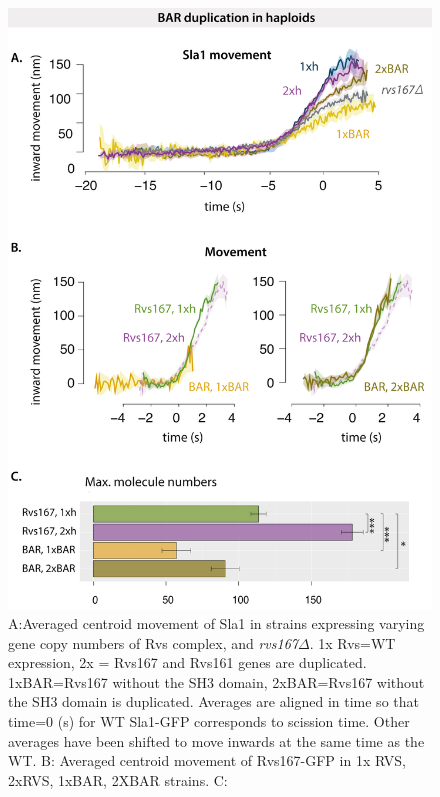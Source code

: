 		\begin{figure}[H]
		\centering
		\includegraphics[width=25cm,height=25 cm,keepaspectratio]{figures/results_final/scaffolding_overlaid3}
		\caption [Progression of invagination with increasing BAR recruitment]
		{A:Averaged centroid movement of Sla1 in strains expressing varying gene copy numbers of Rvs complex, and \textit{rvs167$\Delta$}. 1x Rvs=WT expression, 2x = Rvs167 and Rvs161 genes are duplicated. 1xBAR=Rvs167 without the SH3 domain, 2xBAR=Rvs167 without the SH3 domain is duplicated. Averages are aligned in time so that time=0 (s) for WT Sla1-GFP corresponds to scission time. Other averages have been shifted to move inwards at the same time as the WT.
		B: Averaged centroid movement of Rvs167-GFP in 1x RVS, 2xRVS, 1xBAR, 2XBAR strains.
		C:  }
		\label{fig_scaffold}
		\end{figure}


